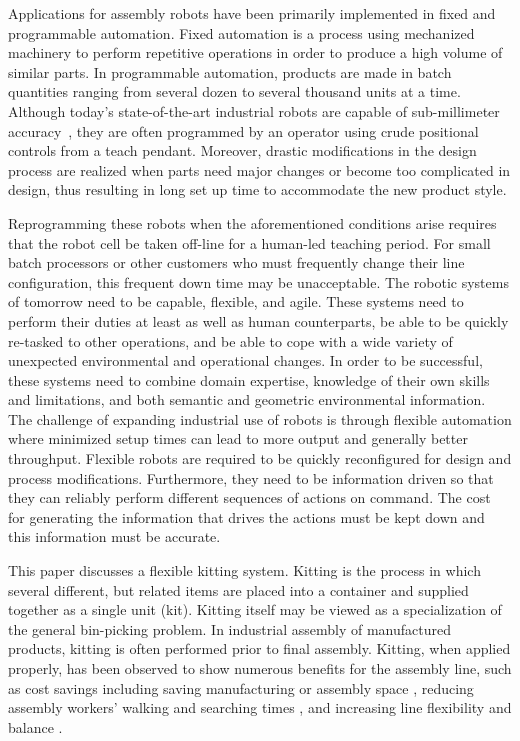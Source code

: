 Applications for assembly robots have been primarily implemented in fixed
and programmable automation. Fixed automation is a process using mechanized
machinery to perform repetitive operations in order to produce a
high volume of similar parts. In programmable automation, products are made
in batch quantities ranging from several dozen to several thousand units at
a time. Although today's state-of-the-art industrial robots are capable of
sub-millimeter accuracy~\cite{RobotAccuracy}, they are often programmed by
an operator using crude positional controls from a teach pendant. Moreover,
drastic modifications in the design process are realized when parts need
major changes or become too complicated in design, thus resulting in long
set up time to accommodate the new product style.

Reprogramming these robots when the aforementioned conditions arise
requires that the robot cell be taken off-line for a human-led teaching
period. For small batch processors or other customers who must frequently
change their line configuration, this frequent down time may be
unacceptable. The robotic systems of tomorrow need to be capable, flexible,
and agile. These systems need to perform their duties at least as well as
human counterparts, be able to be quickly re-tasked to other operations,
and be able to cope with a wide variety of unexpected environmental and
operational changes. In order to be successful, these systems need to
combine domain expertise, knowledge of their own skills and limitations,
and both semantic and geometric environmental information. The challenge of
expanding industrial use of robots is through flexible automation where
minimized setup times can lead to more output and generally better
throughput. Flexible robots are required to be quickly reconfigured for
design and process modifications. Furthermore, they need to be information
driven so that they can reliably perform different sequences of actions on
command. The cost for generating the information that drives the actions
must be kept down and this information must be accurate.

This paper discusses a flexible kitting system. Kitting is the process in
which several different, but related items are placed into a container and
supplied together as a single unit (kit). Kitting itself may be viewed as a
specialization of the general bin-picking problem. In industrial assembly
of manufactured products, kitting is often performed prior to final
assembly. Kitting, when applied properly, has been observed to show
numerous benefits for the assembly line, such as cost
savings \cite{Carlsson_2008} including saving manufacturing or assembly
space \cite{Medbo2003}, reducing assembly workers' walking and searching
times \cite{Schwind1992}, and increasing line flexibility \cite{Bozer1992}
and balance \cite{Jiao2000}.

